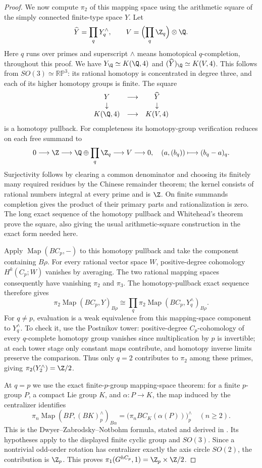 \begin{proof}
We now compute $\pi_2$ of this mapping space using the arithmetic square
of the simply connected finite-type space $Y$. Let
\[
 \widehat Y=\prod_qY_q^{\wedge},\qquad
 V=\Bigl(\prod_q\Z_q\Bigr)\otimes\Q.
\]
Here $q$ runs over primes and superscript $\wedge$ means homotopical
$q$-completion, throughout this proof. We have
$Y_{\Q}\simeq K(\Q,4)$ and
$(\widehat Y)_{\Q}\simeq K(V,4)$. This follows from
$SO(3)\simeq\mathbb {RP}^3$: its rational homotopy is concentrated in
degree three, and each of its higher homotopy groups is finite. The
square
\[
 \begin{matrix}
 Y&\longrightarrow&\widehat Y\\
 \downarrow&&\downarrow\\
 K(\Q,4)&\longrightarrow&K(V,4)
 \end{matrix}
\]
is a homotopy pullback. For completeness its homotopy-group verification
reduces on each free summand to
\[
 0\longrightarrow\Z\longrightarrow
 \Q\oplus\prod_q\Z_q\longrightarrow V\longrightarrow0,
 \quad (a,(b_q))\longmapsto(b_q-a)_q.
\]
Surjectivity follows by clearing a common denominator and choosing its
finitely many required residues by the Chinese remainder theorem; the
kernel consists of rational numbers integral at every prime and is
$\Z$. On finite summands completion gives the product of their primary
parts and rationalization is zero. The long exact sequence of the
homotopy pullback and Whitehead's theorem prove the square, also giving
the usual arithmetic-square construction in the exact form needed here.

Apply $\operatorname{Map}(BC_p,-)$ to this homotopy pullback and take the
component containing $B\rho$. For every rational vector space $W$,
positive-degree cohomology $H^k(C_p;W)$ vanishes by averaging. The two
rational mapping spaces consequently have vanishing $\pi_2$ and
$\pi_3$. The homotopy-pullback exact sequence therefore gives
\[
 \pi_2\operatorname{Map}(BC_p,Y)_{B\rho}
 \cong\prod_q
 \pi_2\operatorname{Map}(BC_p,Y_q^{\wedge})_{B\rho}.
\]
For $q\ne p$, evaluation is a weak equivalence from this mapping-space
component to $Y_q^{\wedge}$. To check it, use the Postnikov tower:
positive-degree $C_p$-cohomology of every $q$-complete homotopy group
vanishes since multiplication by $p$ is invertible; at each tower stage
only constant maps contribute, and homotopy inverse limits preserve
the comparison. Thus only $q=2$ contributes to $\pi_2$ among these
primes, giving $\pi_2(Y_2^{\wedge})=\Z/2$.

At $q=p$ we use the exact finite-$p$-group mapping-space theorem:
for a finite $p$-group $P$, a compact Lie group $K$, and
$\alpha:P\to K$, the map induced by the centralizer identifies
\[
 \pi_n\operatorname{Map}(BP,(BK)_p^{\wedge})_{B\alpha}
  =\bigl(\pi_n B C_K(\alpha(P))\bigr)_p^{\wedge}
  \quad(n\ge2).
\]
This is the Dwyer--Zabrodsky--Notbohm formula, stated and derived in
\cite[Theorem 1.9 and its proof, using Theorem 3.2(iii) of their earlier
paper]{C_JMO1995}. Its hypotheses apply to the displayed finite cyclic
group and $SO(3)$. Since a nontrivial odd-order rotation has centralizer
exactly the axis circle $SO(2)$, the contribution is $\Z_p$.
This proves $\pi_1(G^{hC_p},1)=\Z_p\times\Z/2$.


\end{proof}
